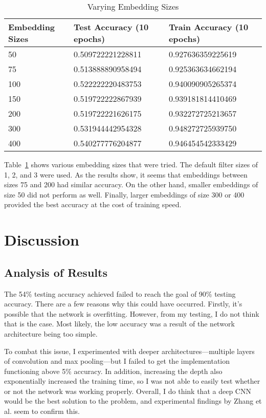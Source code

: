 \documentclass{article}
\begin{document}
\begin{table}[t]
  \caption{Varying Embedding Sizes}
  \label{tab:embedding_sizes}
  \centering
  \begin{tabular}{lll}
    \toprule
    Embedding Sizes & Test Accuracy (10 epochs) & Train Accuracy (10 epochs) \\
    \midrule
    50 & 0.509722221228811 & 0.927636359225619 \\
    75 & 0.513888890958494 & 0.925363634662194 \\
    100 & 0.522222220483753 & 0.940090905265374 \\
    150 & 0.519722222867939 & 0.939181814410469 \\
    200 & 0.519722221626175 & 0.932272725213657 \\
    300 & 0.531944442954328 & 0.948272725939750 \\
    400 & 0.540277776204877 & 0.946454542333429 \\
    \bottomrule
  \end{tabular}
\end{table}

Table~\ref{tab:embedding_sizes} shows various embedding sizes that were tried. The default filter sizes of 1, 2, and 3 were used.
As the results show, it seems that embeddings between sizes 75 and 200 had similar accuracy. On the other hand, smaller embeddings of
size 50 did not perform as well. Finally, larger embeddings of size 300 or 400 provided the best accuracy at the cost of training speed.

\section{Discussion}
\subsection{Analysis of Results}
The 54\% testing accuracy achieved failed to reach the goal of 90\% testing accuracy. There are a few reasons why this could have occurred.
Firstly, it's possible that the network is overfitting. However, from my testing, I do not think that is the case. Most likely, the low
accuracy was a result of the network architecture being too simple.

To combat this issue, I experimented with deeper architectures—multiple layers of convolution and max pooling—but I failed to get the
implementation functioning above 5\% accuracy. In addition, increasing the depth also exponentially increased the training time, so I was not
able to easily test whether or not the network was working properly. Overall, I do think that a deep CNN would be the best solution to the
problem, and experimental findings by Zhang et al. \cite{zhang} seem to confirm this.
\end{document}
